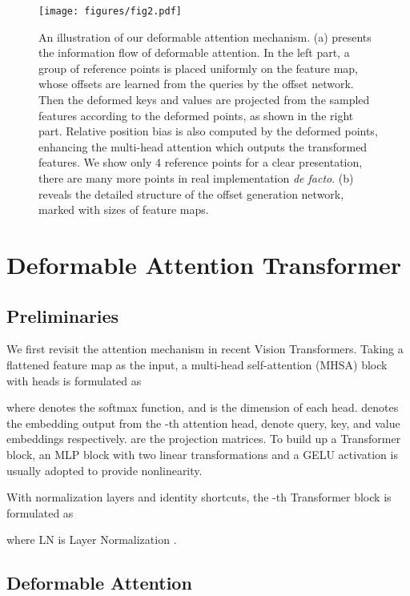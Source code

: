 \begin{figure*}
    \centering
    \texttt{[image: figures/fig2.pdf]}
    \caption{An illustration of our deformable attention mechanism. (a) presents the information flow of deformable attention. In the left part, a group of reference points is placed uniformly on the feature map, whose offsets are learned from the queries by the offset network. Then the deformed keys and values are projected from the sampled features according to the deformed points, as shown in the right part. Relative position bias is also computed by the deformed points, enhancing the multi-head attention which outputs the transformed features. We show only 4 reference points for a clear presentation, there are many more points in real implementation \textit{de facto}. (b) reveals the detailed structure of the offset generation network, marked with sizes of feature maps.}
    \label{fig:fig2}
\end{figure*}
\section{Deformable Attention Transformer}

\subsection{Preliminaries}

We first revisit the attention mechanism in recent Vision Transformers. Taking a flattened feature map  as the input, a multi-head self-attention (MHSA) block with  heads is formulated as 

where  denotes the softmax function, and  is the dimension of each head.  denotes the embedding output from the -th attention head,  denote query, key, and value embeddings respectively.  are the projection matrices. To build up a Transformer block, an MLP block with two linear transformations and a GELU activation is usually adopted to provide nonlinearity.

With normalization layers and identity shortcuts, the -th Transformer block is formulated as

where LN is Layer Normalization \cite{LN}. 




\subsection{Deformable Attention}



